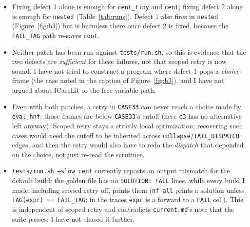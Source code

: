 \documentclass[11pt]{article}
\newcommand{\code}[1]{\texttt{#1}}
\begin{document}
\begin{itemize}[nosep]
\item Fixing defect 1 alone is enough for \code{cent\_tiny} and \code{cent};
  fixing defect 2 alone is enough for \code{nested} (Table~\ref{tab:runs}).
  Defect 1 also fires in \code{nested} (Figure~\ref{fig:b3}) but is
  harmless there once defect 2 is fixed, because the \code{FAIL\_TAG}
  path re-saves \code{root}.
\item Neither patch has been run against \code{tests/run.sh}, so this is
  evidence that the two defects are \emph{sufficient} for these failures,
  not that scoped retry is now sound. I have not tried to construct a
  program where defect 1 pops a \emph{choice} frame (the case noted in the
  caption of Figure~\ref{fig:b3}), and I have not argued about ICaseLit or
  the free-variable path.
\item Even with both patches, a retry in \code{CASE33} can never reach a
  choice made by \code{eval\_hnf}: those frames are below \code{CASE33}'s
  cutoff (here \code{c3} has no alternative left anyway). Scoped retry stays
  a strictly local optimization; recovering such cases would need the cutoff to be inherited
  across \code{collapse}/\code{TAIL\_DISPATCH} edges, and then the retry
  would also have to redo the \emph{dispatch} that depended on the choice,
  not just re-read the scrutinee.
\item \code{tests/run.sh --slow cent} currently reports an output mismatch
  for the default build: the golden file has no \code{SOLUTION: FAIL} lines,
  while every build I made, including scoped retry off, prints them (\code{nf\_all}
  prints a solution unless \code{TAG(expr) == FAIL\_TAG}; in the traces
  \code{expr} is a forward to a \code{FAIL} cell). This is independent of scoped retry and
  contradicts \code{current.md}'s note that the suite passes; I have not
  chased it further.
\end{itemize}
\end{document}

